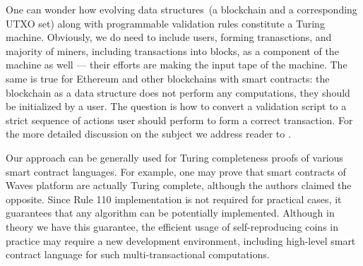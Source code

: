 \documentclass[runningheads]{llncs}
\begin{document}
    One can wonder how evolving data structures~(a blockchain and a
    corresponding UTXO set) along with programmable validation rules constitute
    a Turing machine. Obviously, we do need to include users, forming tranasctions,
    and majority of miners, including transactions into blocks, as a
    component of the machine as well --- their efforts are making the input tape of
    the machine. The same is true for Ethereum and other blockchains with smart
    contracts: the blockchain as a data structure does not perform any computations,
    they should be initialized by a user.
    The question is how to convert a validation script to a strict
    sequence of actions user should perform to form a correct transaction.
    For the more detailed discussion on the subject we address reader
    to .



    Our approach can be generally used for Turing completeness
    proofs of various smart contract languages. For example, one may prove
    that smart contracts of Waves platform \cite{wavesSmarts} are actually
    Turing complete, although the authors claimed the opposite.
    Since Rule 110 implementation is not required for practical cases, it
    guarantees that any algorithm can be potentially implemented.
    Although in theory we have this guarantee, the efficient usage of
    self-reproducing coins in practice may require a new development
    environment, including high-level smart contract language for
    such multi-transactional computations.

\end{document}
